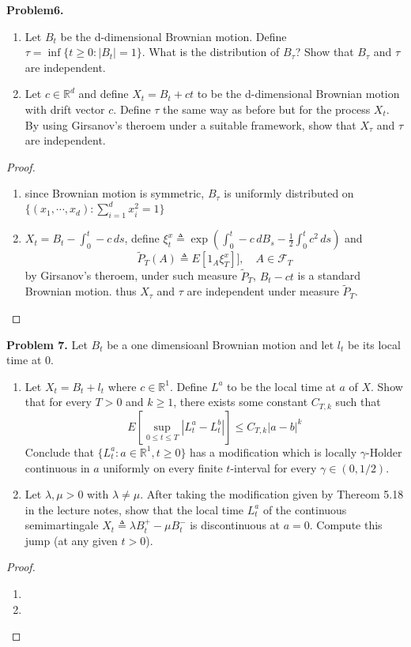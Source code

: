 \documentclass{article}     %
\begin{document}
\noindent
\textbf{Problem6.} 
\begin{enumerate}[(1)]
\item Let $B_t$ be the d-dimensional Brownian motion. Define $\tau = \inf\{t\geq 0: |B_t|=1\}$. What is the distribution of $B_{\tau}$? Show that $B_{\tau}$ and $\tau$ are independent.
\item Let $c \in \mathbb{R}^d$ and define $X_t= B_t + ct$ to be the d-dimensional Brownian motion with drift vector $c$. Define $\tau$ the same way as before but for the process $X_t$. By using Girsanov's theroem under a suitable framework, show that $X_{\tau}$ and $\tau$ are independent. 
\end{enumerate}
\begin{proof}
\begin{enumerate}[(1)]
    \item since Brownian motion is symmetric, $B_{\tau}$ is uniformly distributed on $\{(x_1,\cdots,x_d):\sum^d_{i=1}x^2_i=1\}$
    \item $X_t= B_t-\int_0^t -c\,ds$, define $\xi_t^x \triangleq \exp(\int_0^t -c\,dB_s-\frac{1}{2}\int_0^t c^2\,ds)$ and 
   \[ \widetilde{P}_T(A) \triangleq E[1_A\xi_T^x]],\quad A\in \mathcal{F}_T \]
   by Girsanov's theroem, under such measure $\widetilde{P}_T$, $B_t-ct$ is a standard Brownian motion. thus $X_{\tau}$ and $\tau$ are independent under measure $\widetilde{P}_T$.
\end{enumerate}
\end{proof}

\noindent
\textbf{Problem 7.} Let $B_t$ be a one dimensioanl Brownian motion and let $l_t$ be its local time at 0.
\begin{enumerate}
    \item Let $X_t=B_t+l_t$ where $c \in \mathbb{R}^1$. Define $L^a$ to be the local time at $a$ of $X$. Show that for every $T>0$ and $k\geq 1$, there exists some constant $C_{T,k}$ such that 
      \[E[\sup_{0\leq t\leq T}|L_t^a-L_t^b|]\leq C_{T,k}|a-b|^k\]
      Conclude that $\{L_t^a:a\in \mathbb{R}^1,t\geq 0\}$ has a modification which is locally $\gamma$-Holder continuous in $a$ uniformly on every finite $t$-interval for every $\gamma \in (0,1/2)$.
      \item Let $\lambda,\mu>0$ with $\lambda \neq \mu$. After taking the modification given by Thereom 5.18 in the lecture notes, show that the local time $L_t^a$ of the continuous semimartingale $X_t\triangleq \lambda B_t^+-\mu B_t^-$ is discontinuous at $a=0$. Compute this jump (at any given $t>0$).
\end{enumerate}
\begin{proof}
\begin{enumerate}[(1)]
    \item 
    \item 
    
\end{enumerate}
\end{proof}
\end{document}
